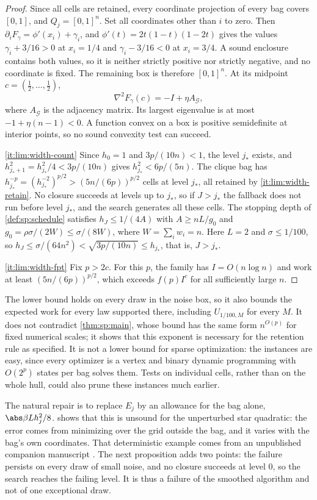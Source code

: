 \begin{proof}
Since all cells are retained, every coordinate projection of every bag
covers $[0,1]$, and $Q_j=[0,1]^n$. Set all coordinates other than $i$ to
zero. Then $\partial_iF_\gamma=\phi'(x_i)+\gamma_i$, and
$\phi'(t)=2t(1-t)(1-2t)$ gives the values $\gamma_i+3/16>0$ at $x_i=1/4$
and $\gamma_i-3/16<0$ at $x_i=3/4$. A sound enclosure contains both values,
so it is neither strictly positive nor strictly negative, and no coordinate
is fixed. The remaining box is therefore $[0,1]^n$. At its midpoint
$c=(\frac12,\ldots,\frac12)$,
\[
 \nabla^2F_\gamma(c)=-I+\eta A_{\mathcal G},
\]
where $A_{\mathcal G}$ is the adjacency matrix. Its largest eigenvalue is at
most $-1+\eta(n-1)<0$. A function convex on a box is positive semidefinite
at interior points, so no sound convexity test can succeed.

\ref{it:lim:width-count}
Since $h_0=1$ and $3p/(10n)<1$, the level $j_*$ exists, and
$h_{j_*+1}^2=h_{j_*}^2/4<3p/(10n)$ gives $h_{j_*}^2<6p/(5n)$. The clique bag
has $h_{j_*}^{-p}=(h_{j_*}^{-2})^{p/2}>(5n/(6p))^{p/2}$ cells at level
$j_*$, all retained by \ref{it:lim:width-retain}. No closure succeeds at
levels up to $j_*$, so if $J>j_*$ the fallback does not run before level
$j_*$, and the search generates all these cells. The stopping depth of
\cref{def:sp:schedule} satisfies $h_J\le1/(4A)$ with $A\ge nL/g_0$ and
$g_0=\rho\sigma/(2W)\le\sigma/(8W)$, where $W=\sum_iw_i=n$. Here $L=2$ and
$\sigma\le1/100$, so $h_J\le\sigma/(64n^2)<\sqrt{3p/(10n)}\le h_{j_*}$, that
is, $J>j_*$.

\ref{it:lim:width-fpt}
Fix $p>2c$. For this $p$, the family has $I=O(n\log n)$ and work at least
$(5n/(6p))^{p/2}$, which exceeds $f(p)I^c$ for all sufficiently large $n$.
\end{proof}

The lower bound holds on every draw in the noise box, so it also bounds the
expected work for every law supported there, including $U_{1/100,M}$ for
every $M$. It does not contradict \cref{thm:sp:main}, whose bound has the
same form $n^{O(p)}$ for fixed numerical scales; it shows that this
exponent is necessary for the retention rule as specified. It is not a lower
bound for sparse optimization: the instances are easy, since every
optimizer is a vertex and binary dynamic programming with $O(2^p)$ states
per bag solves them. Tests on individual cells, rather than on the whole
hull, could also prune these instances much earlier.

The natural repair is to replace $E_j$ by an allowance for the bag alone,
$\abs\beta Lh_j^2/8$.  shows that this is unsound for the
unperturbed star quadratic: the error comes from minimizing over the grid
outside the bag, and it varies with the bag's own coordinates. That
deterministic example comes from an unpublished companion manuscript
\citep{companion-decomposition-aware}. The next proposition adds two points:
the failure persists on every draw of small noise, and no closure succeeds
at level $0$, so the search reaches the failing level. It is thus a failure
of the smoothed algorithm and not of one exceptional draw.

